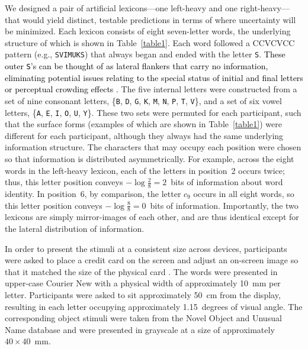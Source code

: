 \documentclass[doc,biblatex]{apa7}
\newcommand\newmaterial[1]{\textcolor{black}{#1}}
\begin{document}
We designed a pair of artificial lexicons---one left-heavy and one right-heavy---that would yield distinct, testable predictions in terms of where uncertainty will be minimized. Each lexicon consists of eight seven-letter words, the underlying structure of which is shown in Table~\ref{table1}. Each word followed a CCVCVCC pattern (e.g., \texttt{SVIMUKS}) that always began and ended with the letter \texttt{S}. \newmaterial{These outer \texttt{S}'s can be thought of as lateral flankers that carry no information, eliminating potential issues relating to the special status of initial and final letters \parencite{Johnson:2012, White:2008} or perceptual crowding effects \parencite{Pelli:2008}.} The five internal letters were constructed from a set of nine consonant letters, \{\texttt{B}, \texttt{D}, \texttt{G}, \texttt{K}, \texttt{M}, \texttt{N}, \texttt{P}, \texttt{T}, \texttt{V}\}, and a set of six vowel letters, \{\texttt{A}, \texttt{E}, \texttt{I}, \texttt{O}, \texttt{U}, \texttt{Y}\}. These two sets were permuted for each participant, such that the surface forms (examples of which are shown in Table~\ref{table1}) were different for each participant, although they always had the same underlying information structure. The characters that may occupy each position were chosen so that information is distributed asymmetrically. For example, across the eight words in the left-heavy lexicon, each of the letters in position~2 occurs twice; thus, this letter position conveys $-\log \frac{2}{8} = 2$~bits of information about word identity. In position~6, by comparison, the letter $c_9$ occurs in all eight words, so this letter position conveys $-\log \frac{8}{8} = 0$~bits of information. Importantly, the two lexicons are simply mirror-images of each other, and are thus identical except for the lateral distribution of information.

In order to present the stimuli at a consistent size across devices, participants were asked to place a credit card on the screen and adjust an on-screen image so that it matched the size of the physical card \parencite{Li:2020}. The words were presented in upper-case Courier New with a physical width of approximately 10~mm per letter. Participants were asked to sit approximately 50~cm from the display, resulting in each letter occupying approximately 1.15~degrees of visual angle. The corresponding object stimuli were taken from the Novel Object and Unusual Name database \parencite{Horst:2016} and were presented in grayscale at a size of approximately $40 \times 40$~mm.
\end{document}
